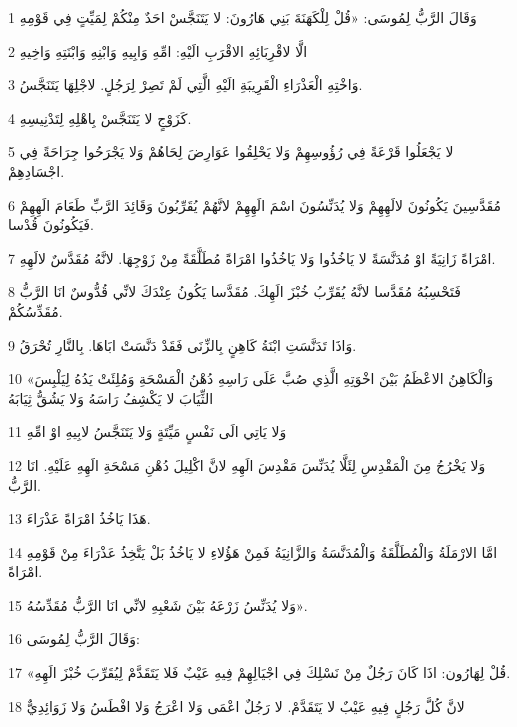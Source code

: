 \par 1 وَقَالَ الرَّبُّ لِمُوسَى: «قُلْ لِلْكَهَنَةَ بَنِي هَارُونَ: لا يَتَنَجَّسْ احَدٌ مِنْكُمْ لِمَيِّتٍ فِي قَوْمِهِ
\par 2 الَّا لاقْرِبَائِهِ الاقْرَبِ الَيْهِ: امِّهِ وَابِيهِ وَابْنِهِ وَابْنَتِهِ وَاخِيهِ
\par 3 وَاخْتِهِ الْعَذْرَاءِ الْقَرِيبَةِ الَيْهِ الَّتِي لَمْ تَصِرْ لِرَجُلٍ. لاجْلِهَا يَتَنَجَّسُ.
\par 4 كَزَوْجٍ لا يَتَنَجَّسْ بِاهْلِهِ لِتَدْنِيسِهِ.
\par 5 لا يَجْعَلُوا قَرْعَةً فِي رُؤُوسِهِمْ وَلا يَحْلِقُوا عَوَارِضَ لِحَاهُمْ وَلا يَجْرَحُوا جِرَاحَةً فِي اجْسَادِهِمْ.
\par 6 مُقَدَّسِينَ يَكُونُونَ لالَهِهِمْ وَلا يُدَنِّسُونَ اسْمَ الَهِهِمْ لانَّهُمْ يُقَرِّبُونَ وَقَائِدَ الرَّبِّ طَعَامَ الَهِهِمْ فَيَكُونُونَ قُدْسا.
\par 7 امْرَاةً زَانِيَةً اوْ مُدَنَّسَةً لا يَاخُذُوا وَلا يَاخُذُوا امْرَاةً مُطَلَّقَةً مِنْ زَوْجِهَا. لانَّهُ مُقَدَّسٌ لالَهِهِ.
\par 8 فَتَحْسِبُهُ مُقَدَّسا لانَّهُ يُقَرِّبُ خُبْزَ الَهِكَ. مُقَدَّسا يَكُونُ عِنْدَكَ لانِّي قُدُّوسٌ انَا الرَّبُّ مُقَدِّسُكُمْ.
\par 9 وَاذَا تَدَنَّسَتِ ابْنَةُ كَاهِنٍ بِالزِّنَى فَقَدْ دَنَّسَتْ ابَاهَا. بِالنَّارِ تُحْرَقُ.
\par 10 «وَالْكَاهِنُ الاعْظَمُ بَيْنَ اخْوَتِهِ الَّذِي صُبَّ عَلَى رَاسِهِ دُهْنُ الْمَسْحَةِ وَمُلِئَتْ يَدُهُ لِيَلْبِسَ الثِّيَابَ لا يَكْشِفُ رَاسَهُ وَلا يَشُقُّ ثِيَابَهُ
\par 11 وَلا يَاتِي الَى نَفْسٍ مَيِّتَةٍ وَلا يَتَنَجَّسُ لابِيهِ اوْ امِّهِ
\par 12 وَلا يَخْرُجُ مِنَ الْمَقْدِسِ لِئَلَّا يُدَنِّسَ مَقْدِسَ الَهِهِ لانَّ اكْلِيلَ دُهْنِ مَسْحَةِ الَهِهِ عَلَيْهِ. انَا الرَّبُّ.
\par 13 هَذَا يَاخُذُ امْرَاةً عَذْرَاءَ.
\par 14 امَّا الارْمَلَةُ وَالْمُطَلَّقَةُ وَالْمُدَنَّسَةُ وَالزَّانِيَةُ فَمِنْ هَؤُلاءِ لا يَاخُذُ بَلْ يَتَّخِذُ عَذْرَاءَ مِنْ قَوْمِهِ امْرَاةً.
\par 15 وَلا يُدَنِّسُ زَرْعَهُ بَيْنَ شَعْبِهِ لانِّي انَا الرَّبُّ مُقَدِّسُهُ».
\par 16 وَقَالَ الرَّبُّ لِمُوسَى:
\par 17 «قُلْ لِهَارُون: اذَا كَانَ رَجُلٌ مِنْ نَسْلِكَ فِي اجْيَالِهِمْ فِيهِ عَيْبٌ فَلا يَتَقَدَّمْ لِيُقَرِّبَ خُبْزَ الَهِهِ.
\par 18 لانَّ كُلَّ رَجُلٍ فِيهِ عَيْبٌ لا يَتَقَدَّمْ. لا رَجُلٌ اعْمَى وَلا اعْرَجُ وَلا افْطَسُ وَلا زَوَائِدِيٌّ
